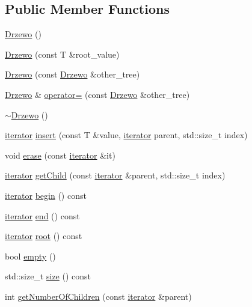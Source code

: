 \subsection*{Public Member Functions}
\begin{DoxyCompactItemize}
\item 
\hyperlink{class_drzewo_a9b87f8101458fea6c866ffd01efa9ef6}{Drzewo} ()
\item 
\hyperlink{class_drzewo_a18f9e596cec9dd18eed19f2b613a7c44}{Drzewo} (const T \&root\+\_\+value)
\item 
\hyperlink{class_drzewo_a337d26f83b35b414b729a147e8995c3e}{Drzewo} (const \hyperlink{class_drzewo}{Drzewo} \&other\+\_\+tree)
\item 
\hyperlink{class_drzewo}{Drzewo} \& \hyperlink{class_drzewo_a409545162097a3cfa6072717c3fd710f}{operator=} (const \hyperlink{class_drzewo}{Drzewo} \&other\+\_\+tree)
\item 
\hyperlink{class_drzewo_acbc76af50077660d8a75eaa4e086eac1}{$\sim$\+Drzewo} ()
\item 
\hyperlink{class_drzewo_1_1iterator}{iterator} \hyperlink{class_drzewo_a3d00b2880e12a416ab749c84ff879a70}{insert} (const T \&value, \hyperlink{class_drzewo_1_1iterator}{iterator} parent, std\+::size\+\_\+t index)
\item 
void \hyperlink{class_drzewo_a338ae0e9b48ee6d513b9f99c81da3d4b}{erase} (const \hyperlink{class_drzewo_1_1iterator}{iterator} \&it)
\item 
\hyperlink{class_drzewo_1_1iterator}{iterator} \hyperlink{class_drzewo_ae45271ae9e1b1071d56c87df7eb37cad}{get\+Child} (const \hyperlink{class_drzewo_1_1iterator}{iterator} \&parent, std\+::size\+\_\+t index)
\item 
\hyperlink{class_drzewo_1_1iterator}{iterator} \hyperlink{class_drzewo_a2f6661025ebf9a3f6c2df1726a0d46ca}{begin} () const
\item 
\hyperlink{class_drzewo_1_1iterator}{iterator} \hyperlink{class_drzewo_aea36f65c42299dd029a38fbf9ed346fb}{end} () const
\item 
\hyperlink{class_drzewo_1_1iterator}{iterator} \hyperlink{class_drzewo_a86f9dd2d9c43b63476cedc0bd14ee878}{root} () const
\item 
bool \hyperlink{class_drzewo_abee09a10667c74ea82f4325addfac3df}{empty} ()
\item 
std\+::size\+\_\+t \hyperlink{class_drzewo_a778ee17b16674b9d0577d22f5d55fa04}{size} () const
\item 
int \hyperlink{class_drzewo_a0f5f70f7dfe35ffce3bb5ba3ac23657b}{get\+Number\+Of\+Children} (const \hyperlink{class_drzewo_1_1iterator}{iterator} \&parent)
\end{DoxyCompactItemize}


